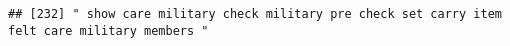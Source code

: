 \documentclass[
]{article}
\begin{document}
\begin{verbatim}
## [232] " show care military check military pre check set carry item felt care military members "                                                                                                                                                                                                                                                                                                                                                                                                                                                                                                                                                                                                                                                                                                                                                                                                                                                                                                                                                                                                                                                                                                                                                                                                                                                                                                                                                                                                                                                                                                                                                                                                                                                                                                       

\end{verbatim}
\end{document}

